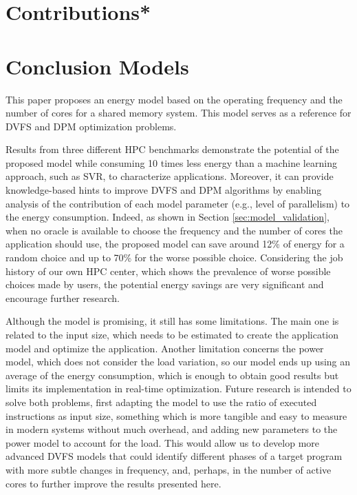 \section{Contributions*} \label{sec:contributions}

\section{Conclusion Models} \label{sec:conclusion_models}
This paper proposes an energy model based on the operating frequency and the number of cores for a shared memory system. This model serves as a reference for DVFS and DPM optimization problems.

Results from three different HPC benchmarks demonstrate the potential of the proposed model while consuming 10 times less energy than a machine learning approach, such as SVR, to characterize applications. Moreover, it can provide knowledge-based hints to improve DVFS and DPM algorithms by enabling analysis of the contribution of each model parameter (e.g., level of parallelism) to the energy consumption. Indeed, as shown in Section \ref{sec:model_validation}, when no oracle is available to choose the frequency and the number of cores the application should use, the proposed model can save around 12\% of energy for a random choice and up to 70\% for the worse possible choice. Considering the job history of our own HPC center, which shows the prevalence of worse possible choices made by users, the potential energy savings are very significant and encourage further research.

Although the model is promising, it still has some limitations. The main one is related to the input size, which needs to be estimated to create the application model and optimize the application. Another limitation concerns the power model, which does not consider the load variation, so our model ends up using an average of the energy consumption, which is enough to obtain good results but limits its implementation in real-time optimization.
Future research is intended to solve both problems, first adapting the model to use the ratio of executed instructions as input size, something which is more tangible and easy to measure in modern systems without much overhead, and adding  new parameters to the power model to account for the load. This would allow us to develop more advanced DVFS models that could identify different phases of a target program with more subtle changes in frequency, and, perhaps, in the number of active cores to  further improve the results presented here.


